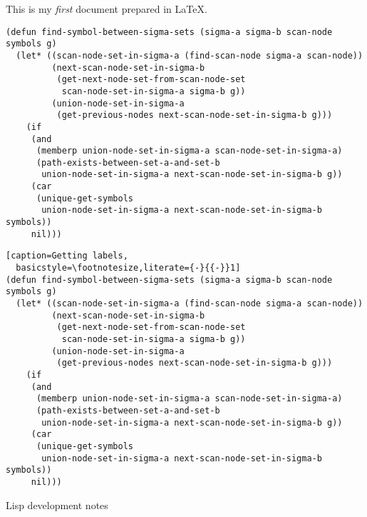 \documentclass{article}
\begin{document}
This is my \emph{first} document prepared in \LaTeX.

\lstset{numbers=left,numberstyle=\tiny,numbersep=5pt,language=Lisp,
  stringstyle=\ttfamily\small,basicstyle=\ttfamily\footnotesize,
  showstringspaces=false,breaklines}


\begin{lstlisting}[caption=Getting labels, label=glabels] 
(defun find-symbol-between-sigma-sets (sigma-a sigma-b scan-node symbols g)
  (let* ((scan-node-set-in-sigma-a (find-scan-node sigma-a scan-node))
         (next-scan-node-set-in-sigma-b 
          (get-next-node-set-from-scan-node-set 
           scan-node-set-in-sigma-a sigma-b g))
         (union-node-set-in-sigma-a 
          (get-previous-nodes next-scan-node-set-in-sigma-b g)))
    (if 
     (and 
      (memberp union-node-set-in-sigma-a scan-node-set-in-sigma-a)
      (path-exists-between-set-a-and-set-b 
       union-node-set-in-sigma-a next-scan-node-set-in-sigma-b g))
     (car 
      (unique-get-symbols 
       union-node-set-in-sigma-a next-scan-node-set-in-sigma-b symbols))
     nil)))
\end{lstlisting} 

\newpage

\begin{lstlisting}[caption=Getting labels,
  basicstyle=\footnotesize,literate={-}{{-}}1]
(defun find-symbol-between-sigma-sets (sigma-a sigma-b scan-node symbols g)
  (let* ((scan-node-set-in-sigma-a (find-scan-node sigma-a scan-node))
         (next-scan-node-set-in-sigma-b 
          (get-next-node-set-from-scan-node-set 
           scan-node-set-in-sigma-a sigma-b g))
         (union-node-set-in-sigma-a 
          (get-previous-nodes next-scan-node-set-in-sigma-b g)))
    (if 
     (and 
      (memberp union-node-set-in-sigma-a scan-node-set-in-sigma-a)
      (path-exists-between-set-a-and-set-b 
       union-node-set-in-sigma-a next-scan-node-set-in-sigma-b g))
     (car 
      (unique-get-symbols 
       union-node-set-in-sigma-a next-scan-node-set-in-sigma-b symbols))
     nil)))
\end{lstlisting} 


Lisp development notes
\end{document}
